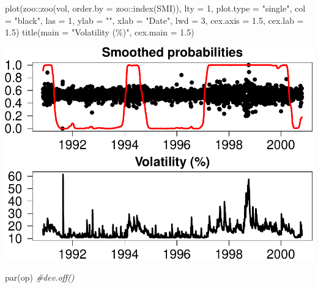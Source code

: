 \documentclass[
]{article}
\newenvironment{Shaded}{\begin{snugshade}}{\end{snugshade}}
\newcommand{\AttributeTok}[1]{\textcolor[rgb]{0.77,0.63,0.00}{#1}}
\newcommand{\CommentTok}[1]{\textcolor[rgb]{0.56,0.35,0.01}{\textit{#1}}}
\newcommand{\DecValTok}[1]{\textcolor[rgb]{0.00,0.00,0.81}{#1}}
\newcommand{\FloatTok}[1]{\textcolor[rgb]{0.00,0.00,0.81}{#1}}
\newcommand{\FunctionTok}[1]{\textcolor[rgb]{0.00,0.00,0.00}{#1}}
\newcommand{\NormalTok}[1]{#1}
\newcommand{\SpecialCharTok}[1]{\textcolor[rgb]{0.00,0.00,0.00}{#1}}
\newcommand{\StringTok}[1]{\textcolor[rgb]{0.31,0.60,0.02}{#1}}
\begin{document}
\begin{Shaded}
\begin{Highlighting}[]
\FunctionTok{plot}\NormalTok{(zoo}\SpecialCharTok{::}\FunctionTok{zoo}\NormalTok{(vol, }\AttributeTok{order.by =}\NormalTok{ zoo}\SpecialCharTok{::}\FunctionTok{index}\NormalTok{(SMI)), }\AttributeTok{lty =} \DecValTok{1}\NormalTok{, }\AttributeTok{plot.type =} \StringTok{"single"}\NormalTok{,}
     \AttributeTok{col =} \StringTok{"black"}\NormalTok{, }\AttributeTok{las =} \DecValTok{1}\NormalTok{, }\AttributeTok{ylab =} \StringTok{""}\NormalTok{, }\AttributeTok{xlab =} \StringTok{"Date"}\NormalTok{, }\AttributeTok{lwd =} \DecValTok{3}\NormalTok{, }\AttributeTok{cex.axis =} \FloatTok{1.5}\NormalTok{, }\AttributeTok{cex.lab =} \FloatTok{1.5}\NormalTok{)}
\FunctionTok{title}\NormalTok{(}\AttributeTok{main =} \StringTok{"Volatility (\%)"}\NormalTok{, }\AttributeTok{cex.main =} \FloatTok{1.5}\NormalTok{)}
\end{Highlighting}
\end{Shaded}

\includegraphics{MS-GARCH_files/figure-latex/unnamed-chunk-10-1.pdf}

\begin{Shaded}
\begin{Highlighting}[]
\FunctionTok{par}\NormalTok{(op)}
\CommentTok{\#dev.off()}
\end{Highlighting}
\end{Shaded}
\end{document}
